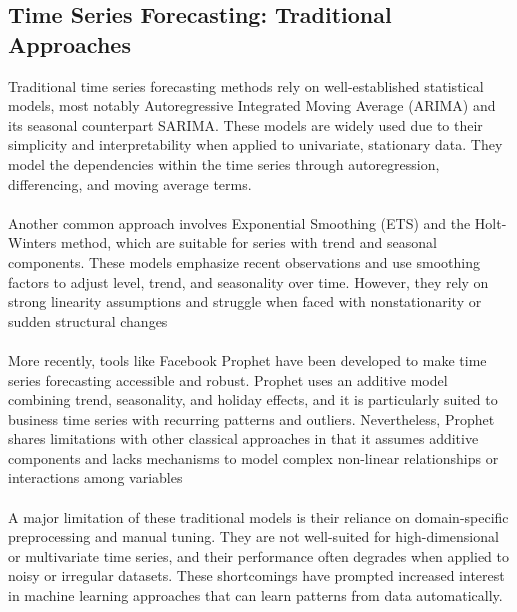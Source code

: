 \documentclass{article}
\begin{document}
\subsection{Time Series Forecasting: Traditional Approaches}
Traditional time series forecasting methods rely on well-established statistical models, most notably Autoregressive Integrated Moving Average (ARIMA) and its seasonal counterpart SARIMA. These models are widely used due to their simplicity and interpretability when applied to univariate, stationary data. They model the dependencies within the time series through autoregression, differencing, and moving average terms.\\
\\
Another common approach involves Exponential Smoothing (ETS) and the Holt-Winters method, which are suitable for series with trend and seasonal components. These models emphasize recent observations and use smoothing factors to adjust level, trend, and seasonality over time. However, they rely on strong linearity assumptions and struggle when faced with nonstationarity or sudden structural changes\\
\\
More recently, tools like Facebook Prophet have been developed to make time series forecasting accessible and robust. Prophet uses an additive model combining trend, seasonality, and holiday effects, and it is particularly suited to business time series with recurring patterns and outliers. Nevertheless, Prophet shares limitations with other classical approaches in that it assumes additive components and lacks mechanisms to model complex non-linear relationships or interactions among variables\\
\\
A major limitation of these traditional models is their reliance on domain-specific preprocessing and manual tuning. They are not well-suited for high-dimensional or multivariate time series, and their performance often degrades when applied to noisy or irregular datasets. These shortcomings have prompted increased interest in machine learning approaches that can learn patterns from data automatically.
\end{document}
